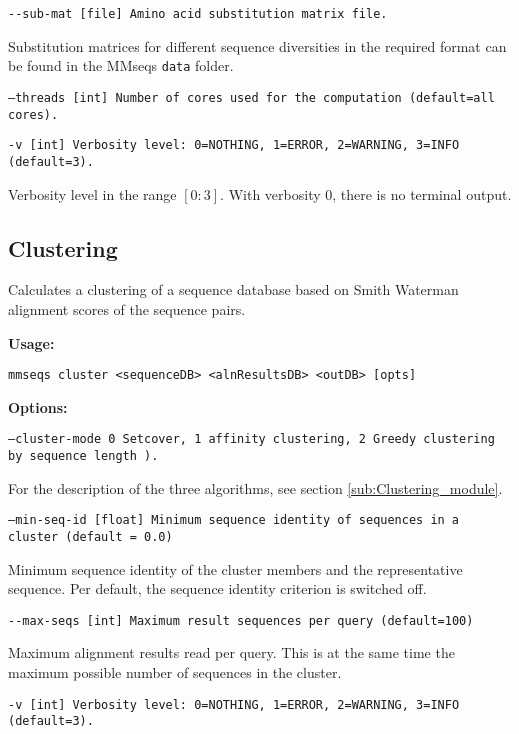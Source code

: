 \documentclass[11pt,a4paper]{report}
\begin{document}
\texttt{\small -{}-sub-mat {[}file{]} Amino acid substitution matrix
file.}{\small \par}

Substitution matrices for different sequence diversities in the required
format can be found in the MMseqs \texttt{data} folder.

\texttt{\small --threads {[}int{]} Number of cores used for the computation
(default=all cores).}{\small \par}

\texttt{\small -v {[}int{]} Verbosity level: 0=NOTHING, 1=ERROR, 2=WARNING,
3=INFO (default=3).}{\small \par}

Verbosity level in the range $[0:3]$. With verbosity $0$, there
is no terminal output.


\subsection{Clustering}

Calculates a clustering of a sequence database based on Smith Waterman
alignment scores of the sequence pairs.

\textbf{Usage:}

\texttt{mmseqs cluster <sequenceDB> <alnResultsDB> <outDB> {[}opts{]}}

\textbf{Options:}

\texttt{\small --cluster-mode 0 Setcover, 1 affinity clustering, 2 Greedy clustering by sequence length
).}{\small \par}

For the description of the three algorithms, see section \ref{sub:Clustering_module}.

\texttt{\small --min-seq-id {[}float{]} Minimum sequence identity of sequences
in a cluster (default = 0.0)}{\small \par}

Minimum sequence identity of the cluster members and the representative
sequence. Per default, the sequence identity criterion is switched
off.

\texttt{\small -{}-max-seqs {[}int{]} Maximum result sequences per
query (default=100)}{\small \par}

Maximum alignment results read per query. This is at the same time
the maximum possible number of sequences in the cluster.

\texttt{\small -v {[}int{]} Verbosity level: 0=NOTHING, 1=ERROR, 2=WARNING,
3=INFO (default=3).}{\small \par}
\end{document}
